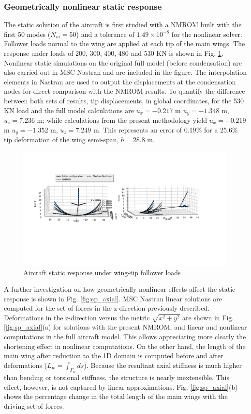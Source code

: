 \documentclass[11pt]{article}
\begin{document}
\subsubsection{Geometrically nonlinear static response}
\label{sec:orgcbb1ccd}
The static solution of the aircraft is first studied with a NMROM built with the first 50 modes ($N_m = 50$)  and a tolerance of $1.49\times 10^{-8}$ for the nonlinear solver. Follower loads normal to the wing are applied at each tip of the main wings. The response under loads of 200, 300, 400, 480 and 530 KN is shown in Fig. \ref{fig:sp_static}. Nonlinear static simulations on the original full model (before condensation) are also carried out in MSC Nastran and are included in the figure. The interpolation elements in Nastran are used to output the displacements at the condensation nodes for direct comparison with the NMROM results. To quantify the difference between both sets of results, tip displacements, in global coordinates, for the 530 KN load and the full model calculations are $u_x = -0.217$ m  $u_y = -1.348$ m, $u_z = 7.236$ m; while calculations from the present methodology yield $u_x = -0.219$ m  $u_y = -1.352$ m, $u_z = 7.249$ m. This represents an error of 0.19$\%$ for a 25.6$\%$ tip deformation of the wing semi-span, $b = 28.8$ m.

\begin{figure}[h!]
\centering
\includegraphics[width=0.99\textwidth]{./img/sp_static3}
\caption{Aircraft static response under wing-tip follower loads}\label{fig:sp_static}
\end{figure}
%
A further investigation on how geometrically-nonlinear effects affect the static response is shown in Fig. \ref{fig:sp_axial}. MSC Nastran linear solutions are computed for the set of forces in the z-direction previously described. Deformations in the z-direction versus the metric $\sqrt{x^2+y^2}$ are shown in Fig. \ref{fig:sp_axial}(a) for solutions with the present NMROM, and linear and nonlinear computations in the full aircraft model. This allows appreciating more clearly the shortening effect in nonlinear computations. On the other hand, the length of the main wing after reduction to the 1D domain is computed before and after deformations ($L_w = \int_{\Gamma_{w}} ds$). Because the resultant axial stiffness is much higher than bending or torsional stiffness, the structure is nearly inextensible. This effect, however, is not captured by linear approximations. Fig. \ref{fig:sp_axial}(b) shows the percentage change in the total length of the main wings with the driving set of forces. 
\end{document}
